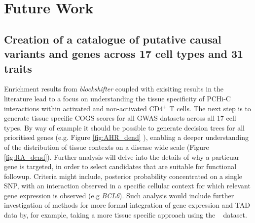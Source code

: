 \documentclass[a4paper,11pt]{report}
\begin{document}
\chapter{Future Work}

\section{Creation of a catalogue of putative causal variants and genes across 17 cell types and 31 traits}
\label{sect:mo_celltypes}

Enrichment results from \textit{blockshifter} coupled with exisiting results in the literature  lead to a focus on understanding the tissue specificity of PCHi-C interactions within activated and non-activated CD4$^{+}$ T cells. The next step is to generate tissue specific COGS scores for all GWAS datasets across all 17 cell types. By way of example it should be possible to generate decision trees for all prioritised genes (e.g. Figure \ref{fig:AHR_dend} ), enabling a deeper understanding of the distribution of tissue contexts on a disease wide scale (Figure \ref{fig:RA_dend}). Further analysis will delve into the details of why a particuar gene is targeted, in order to select candidates that are suitable for functional followup. Criteria might include,  posterior probability concentrated on a single SNP, with an interaction observed in a specific cellular context for which relevant gene expression is observed (e.g \textit{BCL6}). Such analysis would include further investigation of methods for more formal integration of gene expression and TAD data by, for example, taking a more tissue specific approach using the ~\citep{PetersLyonsLeeEtAl2016}  dataset.
\end{document}

